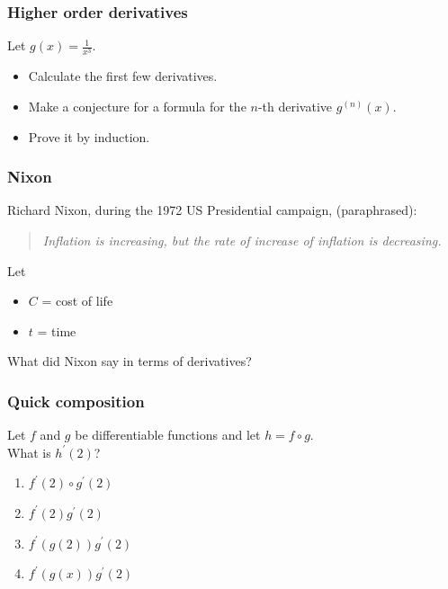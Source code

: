 \begin{frame}[t]
	\frametitle{Higher order derivatives}

	Let $\displaystyle g(x) = \frac{1}{x^{3}}$.

	\begin{itemize}
		\item Calculate the first few derivatives.

		\item Make a conjecture for a formula for the $n$-th derivative $\displaystyle
			g^{(n)}(x)$.

		\item Prove it by induction.
	\end{itemize}
\end{frame}

\begin{frame}
	\frametitle{Nixon}

	Richard Nixon, during the 1972 US Presidential campaign, (paraphrased):

	\begin{quote}
		\emph{Inflation is increasing, but the rate of increase of inflation is decreasing.}
	\end{quote}

	\vfill

	Let
	\begin{itemize}
		\item $C$ = cost of life

		\item $t$ = time
	\end{itemize}
	What did Nixon say in terms of derivatives?

	\vfill
\end{frame}

\begin{frame}
	\frametitle{Quick composition}

	Let $f$ and $g$ be differentiable functions and let $h=f\circ g$. \\ What is $h
	^{\prime}(2)$? \begin {enumerate} \item $f^{\prime}(2)\circ g^{\prime}(2)$
	\item $f^{\prime}(2)g^{\prime}(2)$ \item $f^{\prime}(g(2)) g^{\prime}(2)$
	\item $f^{\prime}(g(x)) g^{\prime}(2)$ \end{enumerate}

\end{frame}

